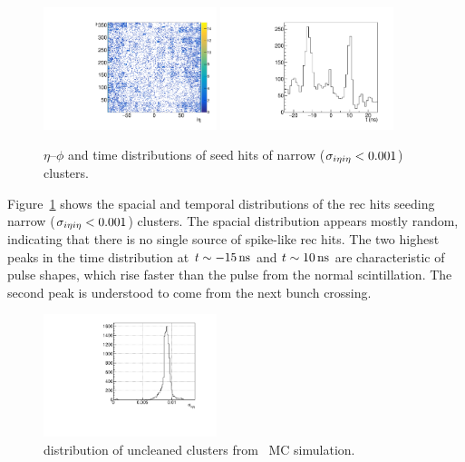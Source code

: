 \begin{figure}[tbp]
  \begin{center}
    \includegraphics[width=0.45\textwidth]{Reconstruction/Figures/spikes/spike_map.pdf}
    \includegraphics[width=0.45\textwidth]{Reconstruction/Figures/spikes/spike_time.pdf}
    \caption{
      $\eta$--$\phi$ and time distributions of seed hits of narrow ($\sigma_{i\eta i\eta} < 0.001$) clusters.
    }
    \label{fig:spike_distributions}
  \end{center}
\end{figure}

Figure~\ref{fig:spike_distributions} shows the spacial and temporal distributions of the rec hits seeding narrow ($\sigma_{i\eta i\eta} < 0.001$) clusters. 
The spacial distribution appears mostly random, indicating that there is no single source of spike-like rec hits. 
The two highest peaks in the time distribution at $t \sim -15\, \text{ns}$ and $t \sim 10\, \text{ns}$ are characteristic of pulse shapes, which rise faster than the pulse from the normal scintillation. 
The second peak is understood to come from the next bunch crossing.

\begin{figure}[tbp]
  \begin{center}
    \includegraphics[width=0.45\textwidth]{Reconstruction/Figures/spikes/sieie_mc.pdf}
    \caption{
      \sieie distribution of uncleaned clusters from \gj\ MC simulation.
    }
    \label{fig:sieie_mc}
  \end{center}
\end{figure}

